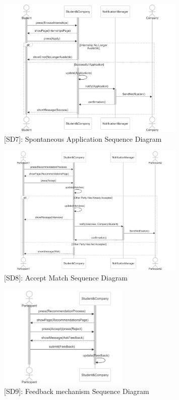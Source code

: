 \begin{figure}
    \centering
    \includegraphics[width=0.8\textwidth]{Latex/Images/SpontaneousApplicationSequenceDiagram.png}
    \caption{[SD7]: Spontaneous Application Sequence Diagram}
    \label{fig:SD7}
\end{figure}

\begin{figure}
    \centering
    \includegraphics[width=0.8\textwidth]{Latex/Images/AcceptMatchSequenceDiagram.png}
    \caption{[SD8]: Accept Match Sequence Diagram}
    \label{fig:SD8}
\end{figure}
\clearpage

\begin{figure}
    \centering
    \includegraphics[width=0.55\textwidth]{Latex/Images/FeedbackMechanismSequenceDiagram.png}
    \caption{[SD9]: Feedback mechanism Sequence Diagram}
    \label{fig:SD9}
\end{figure}

